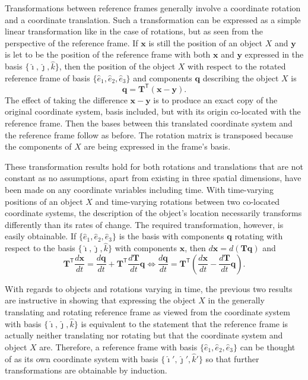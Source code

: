 \documentclass[11pt,dvipsnames]{thesis}
\begin{document}
Transformations between reference frames generally involve a coordinate rotation and a coordinate translation. Such a transformation can be expressed as a simple linear transformation like in the case of rotations, but as seen from the perspective of the reference frame. If $\mathbf{x}$ is still the position of an object $X$ and $\mathbf{y}$ is let to be the position of the reference frame with both $\mathbf{x}$ and $\mathbf{y}$ expressed in the basis $\{\hat{\imath}, \hat{\jmath}, \hat{k}\}$, then the position of the object $X$ with respect to the rotated reference frame of basis $\{\hat{e}_1, \hat{e}_2, \hat{e}_3\}$ and components $\mathbf{q}$ describing the object $X$ is
\begin{equation}
\mathbf{q} = \mathbf{T}^\mathsf{T} (\mathbf{x} - \mathbf{y}).
\end{equation}
The effect of taking the difference $\mathbf{x} - \mathbf{y}$ is to produce an exact copy of the original coordinate system, basis included, but with its origin co-located with the reference frame. Then the bases between this translated coordinate system and the reference frame follow as before. The rotation matrix is transposed because the components of $X$ are being expressed in the frame's basis.

These transformation results hold for both rotations and translations that are not constant as no assumptions, apart from existing in three spatial dimensions, have been made on any coordinate variables including time. With time-varying positions of an object $X$ and time-varying rotations between two co-located coordinate systems, the description of the object's location necessarily transforms differently than its rates of change. The required transformation, however, is easily obtainable. If $\{\hat{e}_1, \hat{e}_2, \hat{e}_3\}$ is the basis with components $\mathbf{q}$ rotating with respect to the basis $\{\hat{\imath}, \hat{\jmath}, \hat{k}\}$ with components $\mathbf{x}$, then $d\mathbf{x} = d(\mathbf{T}\mathbf{q})$ and
\begin{equation}
\mathbf{T}^\mathsf{T} \frac{d\mathbf{x}}{dt} = \frac{d\mathbf{q}}{dt} + \mathbf{T}^\mathsf{T} \frac{d\mathbf{T}}{dt}\mathbf{q} \iff \frac{d\mathbf{q}}{dt} = \mathbf{T}^\mathsf{T}\!\left(\frac{d\mathbf{x}}{dt} - \frac{d\mathbf{T}}{dt}\mathbf{q}\right).
\end{equation}

With regards to objects and rotations varying in time, the previous two results are instructive in showing that expressing the object $X$ in the generally translating and rotating reference frame as viewed from the coordinate system with basis $\{\hat{\imath}, \hat{\jmath}, \hat{k}\}$ is equivalent to the statement that the reference frame is actually neither translating nor rotating but that the coordinate system and object $X$ are. Therefore, a reference frame with basis $\{\hat{e}_1, \hat{e}_2, \hat{e}_3\}$ can be thought of as its own coordinate system with basis $\{\hat{\imath}', \hat{\jmath}', \hat{k}'\}$ so that further transformations are obtainable by induction.
\end{document}
